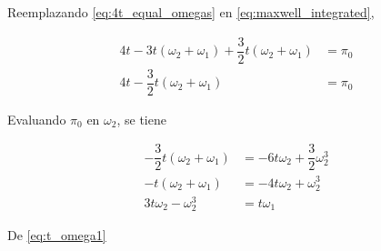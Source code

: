 \documentclass[10pt]{article}
\begin{document}
Reemplazando \ref{eq:4t_equal_omegas} en \ref{eq:maxwell_integrated},

\begin{align}
4t - 3t(\omega_2 + \omega_1) + \dfrac{3}{2} t (\omega_2 + \omega_1) &= \pi_0 \nonumber \\
4t - \dfrac{3}{2} t (\omega_2 + \omega_1) &= \pi_0
\end{align}

Evaluando $\pi_0$ en $\omega_2$, se tiene

\begin{align}
- \dfrac{3}{2} t (\omega_2 + \omega_1) &= -6t\omega_2 +\dfrac{3}{2}\omega_2^3 \nonumber \\
- t (\omega_2 + \omega_1) &= -4t\omega_2 + \omega_2^3 \nonumber \\
3 t \omega_2 - \omega_2^3  &= t \omega_1 \label{eq:t_omega1}
\end{align}

De \ref{eq:t_omega1}
\end{document}

